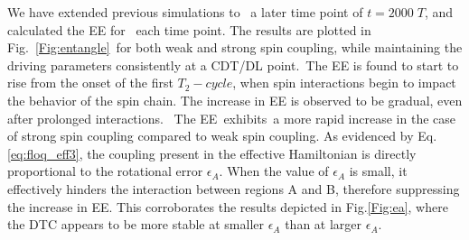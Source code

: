 \documentclass[12pt]{iopart}
\begin{document}
We have extended previous simulations to  a later time point of $t=2000\;T$, and calculated the EE for  each time point. The results are plotted in Fig.~\ref{Fig:entangle} for both weak and strong spin coupling, while maintaining the driving parameters consistently at a CDT/DL point. The EE is found to start to rise from the onset of the first $T_2-cycle$, when spin interactions begin to impact the behavior of the spin chain. The increase in EE is observed to be gradual, even after prolonged interactions.  The EE exhibits a more rapid increase in the case of strong spin coupling compared to weak spin coupling. As evidenced by Eq.\eqref{eq:floq_eff3}, the coupling present in the effective Hamiltonian is directly proportional to the rotational error $\epsilon_A$. When the value of $\epsilon_A$ is small, it effectively hinders the interaction between regions A and B, therefore suppressing the increase in EE. This corroborates the results depicted in Fig.\ref{Fig:ea}, where the DTC appears to be more stable at smaller $\epsilon_A$ than at larger $\epsilon_A$.
	
\end{document}
